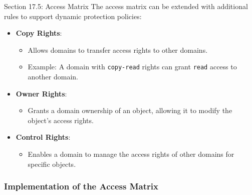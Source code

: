 \begin{notes}{Section 17.5: Access Matrix}
    The access matrix can be extended with additional rules to support dynamic protection policies:
    \begin{itemize}
        \item \textbf{Copy Rights}:
        \begin{itemize}
            \item Allows domains to transfer access rights to other domains.
        \item Example: A domain with \texttt{copy-read} rights can grant \texttt{read} access to another domain.
        \end{itemize}
        \item \textbf{Owner Rights}:
        \begin{itemize}
            \item Grants a domain ownership of an object, allowing it to modify the object's access rights.
        \end{itemize}
        \item \textbf{Control Rights}:
        \begin{itemize}
            \item Enables a domain to manage the access rights of other domains for specific objects.
        \end{itemize}
    \end{itemize}
    
    \subsubsection*{Implementation of the Access Matrix}
    

\end{notes}
